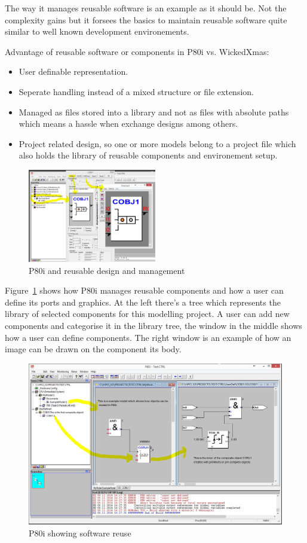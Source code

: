 \documentclass[a4paper,11pt,final]{article}
\begin{document}
The way it manages reusable software is an example as it should be.
Not the complexity gains but it forsees the basics to maintain reusable
software quite similar to well known development environements. 

Advantage of reusable software or components in P80i vs. WickedXmas:
\begin{itemize}
\item User definable representation.
\item Seperate handling instead of a mixed structure or file extension.
\item Managed as files stored into a library and not as files with absolute
paths which means a hassle when exchange designs among others.
\item Project related design, so one or more models belong to a project file
which also holds the library of reusable components and environement setup.
\end{itemize}


\begin{figure}[here]
\center
\includegraphics[width=0.50\textwidth]{p80iObjEditor.JPG}
\caption{P80i and reusable design and management}
\label{fig:p80iObjEditor}
\end{figure}
Figure~\ref{fig:p80iObjEditor} shows how P80i manages reusable components
and how a user can define its ports and graphics.
At the left there's a tree which represents the library of selected
components for this modelling project.
A user can add new components and categorise it in the library tree, the window
in the middle shows how a user can define components. The right window
is an example of how an image can be drawn on the component its body.

\begin{figure}[here]
\includegraphics[width=1.0\textwidth]{p80i.JPG}
\caption{P80i showing software reuse}
\label{fig:p80i}
\end{figure}
\end{document}
